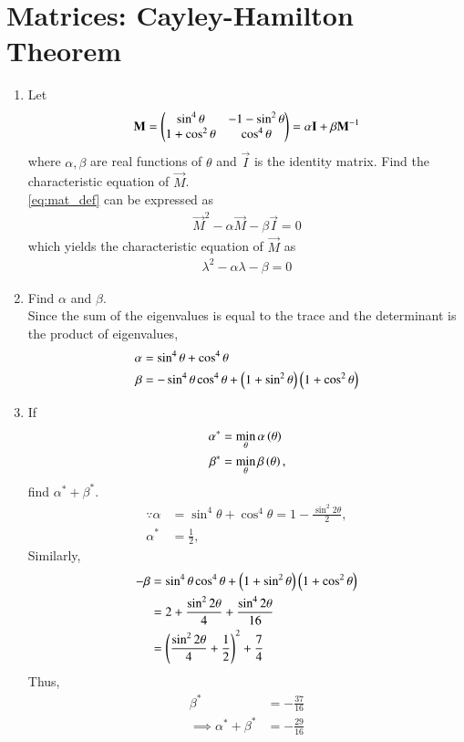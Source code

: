 \documentclass[journal,12pt,twocolumn]{IEEEtran}
\renewcommand\thesection{\arabic{section}}
\begin{document}
\section{Matrices: Cayley-Hamilton Theorem}
\begin{enumerate}[label=\thesection.\arabic*
,ref=\thesection.\theenumi]

\item Let
\begin{align}
\label{eq:mat_def}
\mathbf{M} = \begin{pmatrix}\sin^4\theta & -1-\sin^2\theta \\ 1+ \cos^2\theta & \cos^4\theta\end{pmatrix} = \alpha\mathbf{I} + \beta \mathbf{M}^{-1}
\end{align}
where $\alpha, \beta$ are real functions of $\theta$ and $\vec{I}$ is the identity matrix. Find the characteristic equation of $\vec{M}$.
\\
\solution \eqref{eq:mat_def} can be expressed as
\begin{align}
\vec{M}^2 -\alpha\vec{M} - \beta \vec{I} = 0
\end{align}
%
which yields   the characteristic equation of $\vec{M}$ as
\begin{align}
\lambda^2 -\alpha\lambda - \beta  = 0
\end{align}
\item Find $\alpha$ and $\beta$.
\\
\solution
Since the sum of the eigenvalues is equal to the trace and the determinant is the product of eigenvalues,
\begin{align}
 \alpha &= \sin^4\theta + \cos^4\theta 
\\
  \beta & = -\sin^4\theta \cos^4\theta + \left(1+\sin^2\theta\right)\left( 1+ \cos^2\theta\right)
\end{align}
\item If 
\begin{align}
\alpha^{*} &= \min_{\theta}\alpha\left(\theta\right)
\\
\beta^{*} &= \min_{\theta}\beta\left(\theta\right), 
\end{align}
find $\alpha^{*} + \beta^{*}$.
\\
\solution 
\begin{align}
\because  \alpha &= \sin^4\theta + \cos^4\theta = 1 - \frac{\sin^2 2\theta}{2},
\\
\alpha^{*} &= \frac{1}{2}, 
\end{align}
Similarly,
\begin{align}
 - \beta & = \sin^4\theta \cos^4\theta + \left(1+\sin^2\theta\right)\left( 1+ \cos^2\theta\right)
\\
&=2 + \frac{\sin^2 2\theta}{4} + \frac{\sin^4 2\theta}{16}
\\
&= \left(\frac{\sin^2 2\theta}{4}+\frac{1}{2}\right)^2+ \frac{7}{4} 
\end{align}
Thus,
\begin{align}
 \beta^{*} &= -\frac{37}{16}
\\
\implies \alpha^{*}+\beta^{*} &= -\frac{29}{16}
\end{align}
\end{enumerate}
\end{document}
